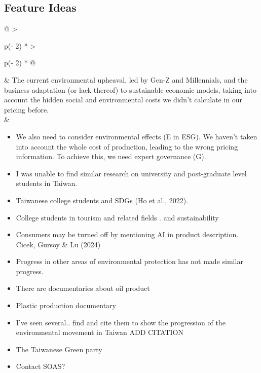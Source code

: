 \documentclass[
  letterpaper,
  DIV=11,
  numbers=noendperiod]{scrartcl}
\begin{document}
\subsection{Feature Ideas}\label{feature-ideas}

\begin{longtable}[]{@{}
  >{\raggedright\arraybackslash}p{(\columnwidth - 2\tabcolsep) * }
  >{\raggedright\arraybackslash}p{(\columnwidth - 2\tabcolsep) * }@{}}
\toprule\noalign{}
\endhead
\bottomrule\noalign{}
\endlastfoot
& The current environmental upheaval, led by Gen-Z and Millennials, and
the business adaptation (or lack thereof) to sustainable economic
models, taking into account the hidden social and environmental costs we
didn't calculate in our pricing before. \\
& \begin{minipage}[t]{\linewidth}\raggedright
\begin{itemize}
\item
  We also need to consider environmental effects (E in ESG). We haven't
  taken into account the whole cost of production, leading to the wrong
  pricing information. To achieve this, we need expert governance (G).
\item
  I was unable to find similar research on university and post-graduate
  level students in Taiwan.
\item
  Taiwanese college students and SDGs (Ho et al., 2022).
\item
  College students in tourism and related fields . and sustainability
\item
  Consumers may be turned off by mentioning AI in product description.
  Cicek, Gursoy \& Lu (2024)
\item
  Progress in other areas of environmental protection has not made
  similar progress.
\item
  There are documentaries about oil product
\item
  Plastic production documentary
\item
  I've seen several.. find and cite them to show the progression of the
  environmental movement in Taiwan ADD CITATION
\item
  The Taiwanese Green party
\item
  Contact SOAS?
\end{itemize}
\end{minipage} \\
\end{longtable}
\end{document}
